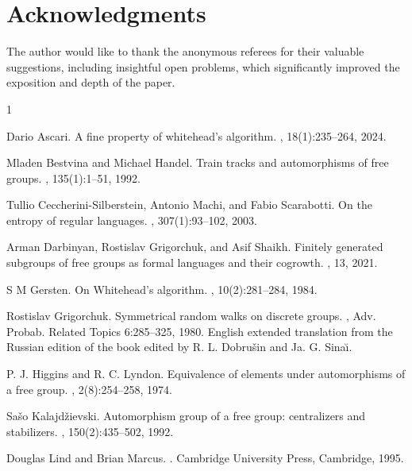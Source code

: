\documentclass{article}
\begin{document}
\section{Acknowledgments}
The author would like to thank the anonymous referees for their valuable suggestions, including insightful open problems, which significantly improved the exposition and depth of the paper.
 
\begin{thebibliography}{1}

Dario Ascari.
\newblock A fine property of whitehead's algorithm.
, 18(1):235--264, 2024.

Mladen Bestvina and Michael Handel.
\newblock Train tracks and automorphisms of free groups.
, 135(1):1--51, 1992.

Tullio Ceccherini-Silberstein, Antonio Machi, and Fabio Scarabotti.
\newblock On the entropy of regular languages.
, 307(1):93--102, 2003.

Arman Darbinyan, Rostislav Grigorchuk, and Asif Shaikh.
\newblock Finitely generated subgroups of free groups as formal languages and
  their cogrowth.
, 13, 2021.

S M Gersten.
\newblock On Whitehead's algorithm.
, 10(2):281--284, 1984.

Rostislav Grigorchuk.
\newblock Symmetrical random walks on discrete groups.
, Adv. Probab. Related Topics 6:285--325, 1980.
\newblock English  extended  translation  from  the  Russian  edition  of  the book
edited by R. L. Dobru\v{s}in and Ja. G. Sina\u{\i}.	

P. J. Higgins and R. C. Lyndon. 
\newblock Equivalence of elements under automorphisms of a free group.
, 2(8):254--258, 1974.

Sa{\v{s}}o Kalajd{\v{z}}ievski. 
\newblock Automorphism group of a free group: centralizers and stabilizers.
, 150(2):435--502, 1992.

Douglas Lind and Brian Marcus.
.
\newblock Cambridge University Press, Cambridge, 1995.


\end{thebibliography}
\end{document}

